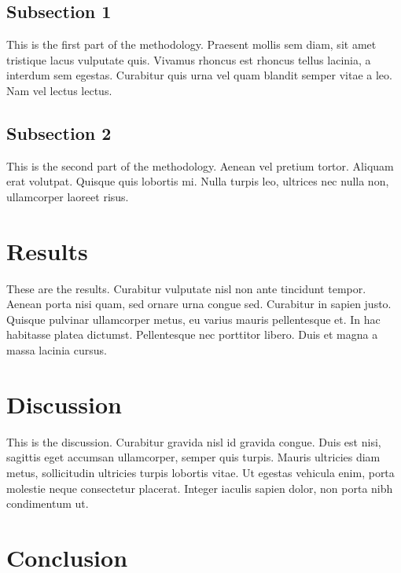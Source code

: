 \documentclass[12pt,turkish,a4paperpaper,]{report}
\begin{document}
\hypertarget{subsection-1-2}{%
\subsection{Subsection 1}\label{subsection-1-2}}

This is the first part of the methodology. Praesent mollis sem diam, sit
amet tristique lacus vulputate quis. Vivamus rhoncus est rhoncus tellus
lacinia, a interdum sem egestas. Curabitur quis urna vel quam blandit
semper vitae a leo. Nam vel lectus lectus.

\hypertarget{subsection-2-3}{%
\subsection{Subsection 2}\label{subsection-2-3}}

This is the second part of the methodology. Aenean vel pretium tortor.
Aliquam erat volutpat. Quisque quis lobortis mi. Nulla turpis leo,
ultrices nec nulla non, ullamcorper laoreet risus.

\hypertarget{results-3}{%
\section{Results}\label{results-3}}

These are the results. Curabitur vulputate nisl non ante tincidunt
tempor. Aenean porta nisi quam, sed ornare urna congue sed. Curabitur in
sapien justo. Quisque pulvinar ullamcorper metus, eu varius mauris
pellentesque et. In hac habitasse platea dictumst. Pellentesque nec
porttitor libero. Duis et magna a massa lacinia cursus.

\hypertarget{discussion-3}{%
\section{Discussion}\label{discussion-3}}

This is the discussion. Curabitur gravida nisl id gravida congue. Duis
est nisi, sagittis eget accumsan ullamcorper, semper quis turpis. Mauris
ultricies diam metus, sollicitudin ultricies turpis lobortis vitae. Ut
egestas vehicula enim, porta molestie neque consectetur placerat.
Integer iaculis sapien dolor, non porta nibh condimentum ut.

\hypertarget{conclusion-4}{%
\section{Conclusion}\label{conclusion-4}}
\end{document}
